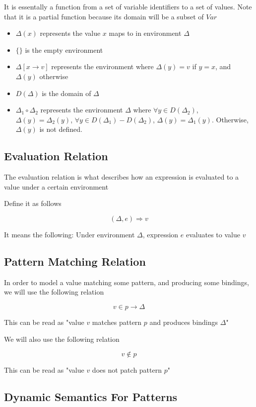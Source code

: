 \documentclass[titlepage]{article}
\begin{document}
It is essentally a function from a set of variable identifiers to a set of values. Note that it is a partial function because its domain will be a subset of $Var$
\begin{itemize}
\item $\Delta (x)$ represents the value $x$ maps to in environment $\Delta$
\item $\{\}$ is the empty environment
\item $\Delta [x \rightarrow v]$ represents the environment where $\Delta (y) = v$ if $y = x$, and $\Delta (y)$ otherwise
\item $D(\Delta)$ is the domain of $\Delta$
\item $\Delta_1 \circ \Delta_2$ represents the environment $\Delta$ where $\forall y \in D(\Delta_2)$, $\Delta(y) = \Delta_2(y)$, $\forall y \in D(\Delta_1) - D(\Delta_2)$, $\Delta(y) = \Delta_1(y)$. Otherwise, $\Delta(y)$ is not defined.
\end{itemize}

\subsection{Evaluation Relation}

The evaluation relation is what describes how an expression is evaluated to a value under a certain environment

Define it as follows

$$(\Delta, e) \Rightarrow v$$

It means the following: Under environment $\Delta$, expression $e$ evaluates to value $v$

\subsection{Pattern Matching Relation}

In order to model a value matching some pattern, and producing some bindings, we will use the following relation

$$v \in p \rightarrow \Delta$$

This can be read as "value $v$ matches pattern $p$ and produces bindings $\Delta$"

We will also use the following relation

$$v \notin p$$

This can be read as "value $v$ does not patch pattern $p$"

\subsection{Dynamic Semantics For Patterns}
\end{document}
